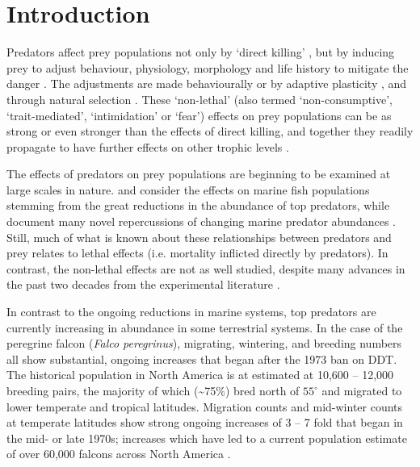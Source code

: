 \section{Introduction}

Predators affect prey populations not only by `direct killing' \citep[also termed `lethal',  `consumptive', `density-mediated' or `mortality' effects; ][]{christianson2014ecosystem}, but by inducing prey to adjust behaviour, physiology, morphology and life history to mitigate the danger \citep{moll2017many}. The adjustments are made behaviourally or by adaptive plasticity \citep[e.g.][]{domenici2007predator}, and through natural selection \citep[e.g.][]{reznick1990experimentally}. These `non-lethal' (also termed `non-consumptive', `trait-mediated', `intimidation' or `fear') effects on prey populations can be as strong or even stronger than the effects of direct killing, and together they readily propagate to have further effects on other trophic levels \citep{Terborgh2010,ohgushi2012trait}.


The effects of predators on prey populations are beginning to be examined at large scales in nature. \citet{madin2016human} and \citet{myers2003rapid} consider the effects on marine fish populations stemming from the great reductions in the abundance of top predators, while \citet{heithaus2008predicting} document many novel repercussions of changing marine predator abundances \citep[see also ][]{estes2011trophic,babcock2010decadal}. Still, much of what is known about these relationships between predators and prey relates to lethal effects (i.e. mortality inflicted directly by predators). In contrast, the non-lethal effects \citep[e.g. influences of predator presence on prey behaviour and morphology; see ][Box 1]{madin2016human} are not as well studied, despite many advances in the past two decades from the experimental literature \citep[reviewed by ][]{long2012impact}.

In contrast to the ongoing reductions in marine systems, top predators are currently increasing in abundance in some terrestrial systems. In the case of the peregrine falcon (\textit{Falco peregrinus}), migrating, wintering, and breeding numbers all show substantial, ongoing increases that began after the 1973 ban on DDT.  The historical population in North America is at estimated at 10,600 -- 12,000 breeding pairs, the majority of which (\textasciitilde75\%) bred north of $55^{\circ}$ \citep[including Greenland; ][p. 6]{cade2003return} and migrated to lower temperate and tropical latitudes. Migration counts \citep{mccarty2005using} and mid-winter counts at temperate latitudes \citep{Ydenberg2017} show strong ongoing increases of 3 -- 7 fold that began in the mid- or late 1970s; increases which have led to a current population estimate of over 60,000 falcons across North America \citep[though this is a very rough estimate][]{COSEWIC_PEFA_2017}.

